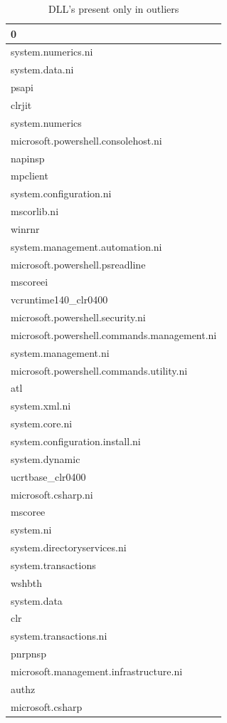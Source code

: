 \documentclass[a4paper,twoside,12pt]{book}
\begin{document}
\begin{table}
	\centering
	\caption{DLL's present only in outliers}
	\label{id:tab:outlierDLLs}
\begin{tabular}{l}
	\toprule
											   0 \\
	\midrule
							  system.numerics.ni \\
								  system.data.ni \\
										   psapi \\
										  clrjit \\
								 system.numerics \\
			 microsoft.powershell.consolehost.ni \\
										 napinsp \\
										mpclient \\
						 system.configuration.ni \\
									 mscorlib.ni \\
										  winrnr \\
				 system.management.automation.ni \\
				 microsoft.powershell.psreadline \\
										mscoreei \\
							vcruntime140\_clr0400 \\
				microsoft.powershell.security.ni \\
	 microsoft.powershell.commands.management.ni \\
							system.management.ni \\
		microsoft.powershell.commands.utility.ni \\
											 atl \\
								   system.xml.ni \\
								  system.core.ni \\
				 system.configuration.install.ni \\
								  system.dynamic \\
								ucrtbase\_clr0400 \\
							 microsoft.csharp.ni \\
										 mscoree \\
									   system.ni \\
					 system.directoryservices.ni \\
							 system.transactions \\
										  wshbth \\
									 system.data \\
											 clr \\
						  system.transactions.ni \\
										 pnrpnsp \\
		  microsoft.management.infrastructure.ni \\
										   authz \\
								microsoft.csharp \\
	\bottomrule
\end{tabular}
\end{table}
\end{document}

